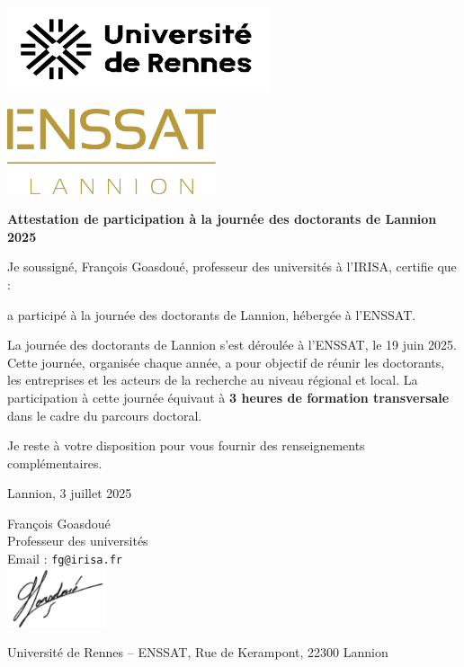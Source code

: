 \documentclass[12pt,a4paper]{article}
\begin{document}
\begin{minipage}[t]{0.45\textwidth}
    \includegraphics[height=2.5cm]{logo_rennes.png}
\end{minipage}
\hfill
\begin{minipage}[t]{0.45\textwidth}
    \raggedleft
    \includegraphics[height=2.5cm]{logo_enssat.png}
\end{minipage}

\vspace{1.5cm}

\begin{center}
    {\LARGE\bfseries Attestation de participation à la journée des doctorants de Lannion 2025}
\end{center}

\vspace{1.5cm}

Je soussigné, François Goasdoué, professeur des universités à l'IRISA, certifie que :\\

\vspace{0.5cm}


\vspace{0.5cm}

a participé à la journée des doctorants de Lannion, hébergée à l’ENSSAT.

La journée des doctorants de Lannion s’est déroulée à l’ENSSAT, le 19 juin 2025. Cette journée, organisée chaque année, a pour objectif de réunir les doctorants, les entreprises et les acteurs de la recherche au niveau régional et local. La participation à cette journée équivaut à \textbf{3 heures de formation transversale} dans le cadre du parcours doctoral.


\vspace{1cm}

Je reste à votre disposition pour vous fournir des renseignements complémentaires.

\vspace{1.5cm}

\begin{flushright}
Lannion, 3 juillet 2025

François Goasdoué\\
Professeur des universités\\
Email : \texttt{fg@irisa.fr}\\
\includegraphics[height=1.75cm]{signature.png}


\end{flushright}

\vfill

{\small
Université de Rennes – ENSSAT, Rue de Kerampont, 22300 Lannion \\
}
\end{document}
